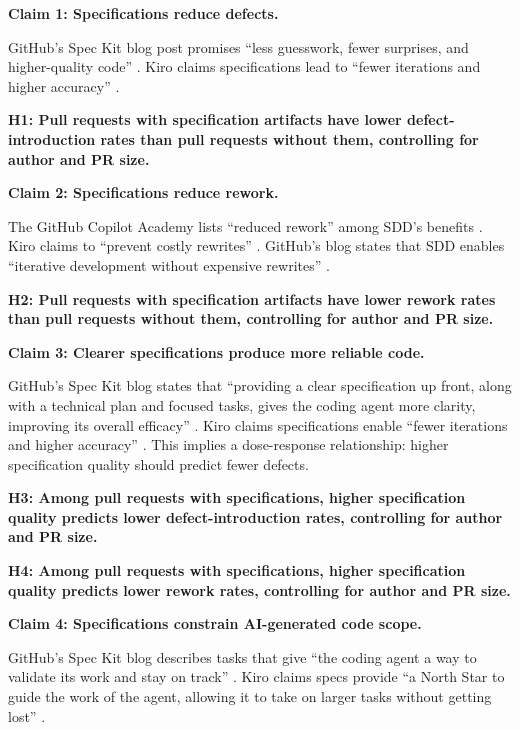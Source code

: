 \documentclass[a4paper,UKenglish,cleveref,autoref,thm-restate]{lipics-v2021}
\begin{document}
\noindent
\textbf{Claim 1: Specifications reduce defects.}

GitHub's Spec Kit blog post promises ``less guesswork, fewer surprises, and higher-quality code'' \cite{speckit2025}. Kiro claims specifications lead to ``fewer iterations and higher accuracy'' \cite{kiro2025b}.

\noindent
\textbf{H1: Pull requests with specification artifacts have lower defect-introduction rates than pull requests without them, controlling for author and PR size.}

\noindent
\textbf{Claim 2: Specifications reduce rework.}

The GitHub Copilot Academy lists ``reduced rework'' among SDD's benefits \cite{copilotacademy2025}. Kiro claims to ``prevent costly rewrites'' \cite{kiro2025b}. GitHub's blog states that SDD enables ``iterative development without expensive rewrites'' \cite{speckit2025}.

\noindent
\textbf{H2: Pull requests with specification artifacts have lower rework rates than pull requests without them, controlling for author and PR size.}

\noindent
\textbf{Claim 3: Clearer specifications produce more reliable code.}

GitHub's Spec Kit blog states that ``providing a clear specification up front, along with a technical plan and focused tasks, gives the coding agent more clarity, improving its overall efficacy'' \cite{speckit2025}. Kiro claims specifications enable ``fewer iterations and higher accuracy'' \cite{kiro2025b}. This implies a dose-response relationship: higher specification quality should predict fewer defects.

\noindent
\textbf{H3: Among pull requests with specifications, higher specification quality predicts lower defect-introduction rates, controlling for author and PR size.}

\noindent
\textbf{H4: Among pull requests with specifications, higher specification quality predicts lower rework rates, controlling for author and PR size.}

\noindent
\textbf{Claim 4: Specifications constrain AI-generated code scope.}

GitHub's Spec Kit blog describes tasks that give ``the coding agent a way to validate its work and stay on track'' \cite{speckit2025}. Kiro claims specs provide ``a North Star to guide the work of the agent, allowing it to take on larger tasks without getting lost'' \cite{kiro2025}.
\end{document}
